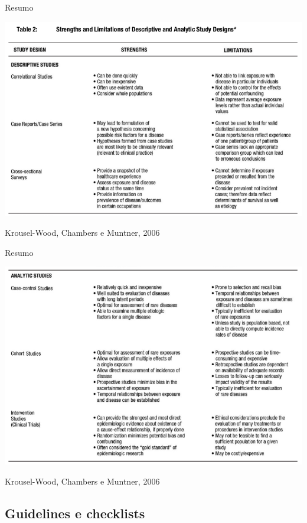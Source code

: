 \documentclass{beamer}
\begin{document}
\begin{frame}{Resumo}
  \begin{center}
    \includegraphics[width=\textwidth]{Metodos/estudos-resumo1}
  \end{center}

  \vfill
  \tiny
  \hfill Krousel-Wood, Chambers e Muntner, 2006
\end{frame}

\begin{frame}{Resumo}
  \begin{center}
    \includegraphics[width=\textwidth]{Metodos/estudos-resumo2}
  \end{center}

  \vfill
  \tiny
  \hfill Krousel-Wood, Chambers e Muntner, 2006
\end{frame}

\subsection{Guidelines e checklists}
\end{document}
